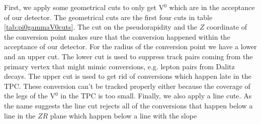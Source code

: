 \renewcommand{\arraystretch}{1.3}
\begin{table}[t]
\caption{V$^0$ cuts used in the analysis; CP $\widehat{=}$ Conversion Point; $f \left(\eta_{\text{max}} \right)$ is defined in equation \ref{eqn:slope}}
\label{tab:pi0gammaV0cuts}
\end{table}
\renewcommand{\arraystretch}{1.0}
First, we apply some geometrical cuts to only get V$^0$ which are in the acceptance of our detector. The geometrical cuts are the first four cuts in table \ref{tab:pi0gammaV0cuts}. The cut on the pseudorapidity and the $Z$ coordinate of the conversion point makes sure that the conversion happened within the acceptance of our detector. For the radius of the conversion point we have a lower and an upper cut. The lower cut is used to suppress track pairs coming from the primary vertex that might mimic conversions, e.g. lepton pairs from Dalitz decays. The upper cut is used to get rid of conversions which happen late in the TPC. These conversion can't be tracked properly either because the coverage of the legs of the V$^0$ in the TPC is too small. Finally, we also apply a line cute. As the name suggests the line cut rejects all of the conversions that happen below a line in the $ZR$ plane which happen below a line with the slope
